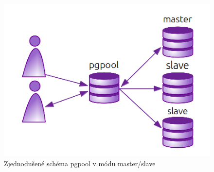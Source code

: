       \begin{figure}[H]
        \centering
        \includegraphics[scale=1]{../../../grafy/obr/schema_pgpool.png}
        \caption{Zjednodušené schéma pgpool v módu master/slave}
        \label{opgpool}
      \end{figure}

